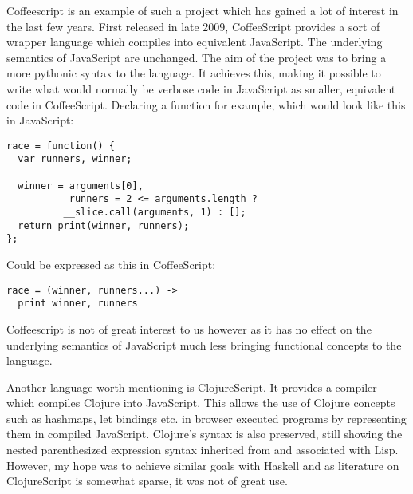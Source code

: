 Coffeescript is an example of such a project which has gained a lot
of interest in the last few years. First released in late 2009, 
CoffeeScript provides a sort of wrapper language which compiles into
equivalent JavaScript. The underlying semantics of JavaScript are
unchanged. The aim of the project was to bring a more pythonic 
syntax to the language. It achieves this, making it possible to 
write what would normally be verbose code in JavaScript as 
smaller, equivalent code in CoffeeScript. Declaring a function for
example, which would look like this in JavaScript:

\begin{verbatim}
race = function() {
  var runners, winner;

  winner = arguments[0], 
           runners = 2 <= arguments.length ? 
          __slice.call(arguments, 1) : [];
  return print(winner, runners);
};
\end{verbatim}

\noindent Could be expressed as this in CoffeeScript: 

\begin{verbatim}
race = (winner, runners...) ->
  print winner, runners
\end{verbatim}

\noindent Coffeescript is not of great interest to us however as it has no
effect on the underlying semantics of JavaScript much less bringing
functional concepts to the language.

Another language worth mentioning is ClojureScript. It provides a compiler
which compiles Clojure into JavaScript. This allows the use of Clojure concepts
such as hashmaps, let bindings etc. in browser executed programs by 
representing them in compiled JavaScript. Clojure's syntax is also preserved,
still showing the nested parenthesized expression syntax inherited from and
associated with Lisp. However, my hope was to achieve similar goals with 
Haskell and as literature on ClojureScript is somewhat sparse, it was not
of great use.